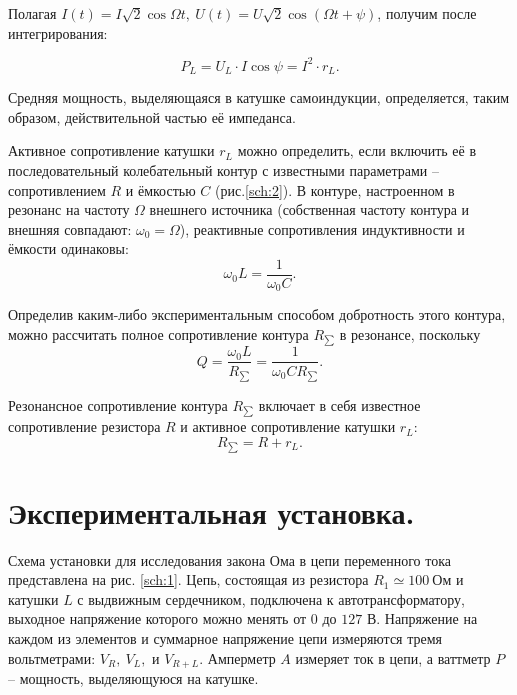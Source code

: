 \documentclass[a4paper, 12pt, twoside]{article}
\begin{document}
Полагая $I(t) = I\sqrt{2}\cos \Omega t,~U(t) = U\sqrt{2}\cos(\Omega t+\psi)$, получим после интегрирования:

\begin{equation}
\label{eq5}
P_L = U_L\cdot I \cos \psi = I^2\cdot r_L.
\end{equation}

Средняя мощность, выделяющаяся в катушке самоиндукции, определяется, таким образом, действительной частью её импеданса.

Активное сопротивление катушки $r_L$ можно определить, если включить её в последовательный колебательный контур с известными параметрами -- сопротивлением $R$ и ёмкостью $C$ (рис.\ref{sch:2}). В контуре, настроенном в резонанс на частоту $\Omega$ внешнего источника (собственная частоту контура и внешняя совпадают: $\omega_0=\Omega$), реактивные сопротивления индуктивности и ёмкости одинаковы:
\begin{equation}
\label{eq:6}
\omega_0 L = \dfrac{1}{\omega_0 C}.
\end{equation}

Определив каким-либо экспериментальным способом добротность этого контура, можно рассчитать полное сопротивление контура $R_{\sum}$ в резонансе, поскольку 
\begin{equation}
\label{eq:7}
Q = \dfrac{\omega_0 L}{R_{\sum}} = \dfrac{1}{\omega_0 C R_{\sum}}.
\end{equation}

Резонансное сопротивление контура $R_{\sum}$ включает в себя известное сопротивление резистора $R$ и активное сопротивление катушки $r_L$:
\begin{equation}
\label{eq:8}
R_{\sum} = R + r_L.
\end{equation}


\section{Экспериментальная установка.}

Схема установки для исследования закона Ома в цепи переменного тока представлена на рис. \ref{sch:1}. Цепь, состоящая из резистора $R_1 \simeq 100~\text{Ом}$ и катушки $L$ с выдвижным сердечником, подключена к автотрансформатору, выходное напряжение которого можно менять от $0$ до $127$ В. Напряжение на каждом из элементов и суммарное напряжение цепи измеряются тремя вольтметрами: $V_R,~V_L,$ и $V_{R+L}$. Амперметр $A$ измеряет ток в цепи, а ваттметр $P$ -- мощность, выделяющуюся на катушке.
\end{document}
